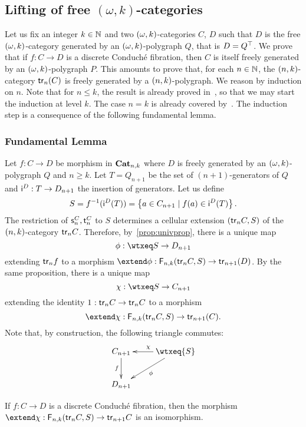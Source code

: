 \subsection{Lifting of free
  $(\omega,k)$-categories}\label{subsec:lifting}
\begin{paragr}
  Let us fix an integer $k\in\mathbb N$ and two $(\omega,k)$-categories
$C$, $D$ such that $D$ is the free $(\omega,k)$-category
generated by an $(\omega,k)$-polygraph $Q$, that is
$D=Q^\top$. We prove that if $f:C\to D$ is a discrete Conduché
fibration, then $C$ is itself freely generated by an
$(\omega,k)$-polygraph $P$. This amounts to prove that, for each
$n\in \mathbb N$, the $(n,k)$-category $\mathsf{tr}_{n}(C)$ is freely generated by
a $(n,k)$-polygraph. We reason by induction on $n$. Note that for
$n\leq k$, the result is already proved in~\cite{guetta:poldcf}, so that
we may start the induction at level $k$. The case $n=k$ is already
covered by~\cite{guetta:poldcf}. The induction step is a consequence
of the following fundamental lemma.
\end{paragr}
\subsubsection{Fundamental Lemma}\label{ssubsec:fundamental}
Let $f:C\to D$ be morphism in $\mathbf{Cat}_{n,k}$ where $D$ is freely
generated by an $(\omega,k)$-polygraph $Q$ and $n\geq k$. Let
$T=Q_{n+1}$ be the set of $(n{+}1)$-generators of $Q$ and
$\mathsf{i}^D:T\to D_{n+1}$ the insertion of generators.  Let us define
\[
  S=f^{-1}(\mathsf{i}^D(T))=\left\{ a\in C_{n+1}\; | \; f(a)\in \mathsf{i}^D(T)\right\}.
\]
The restriction of $\mathsf{s}_{n}^C,\mathsf{t}_{n}^C$ to $S$ determines a
cellular extension $(\mathsf{tr}_{n}C,S)$ of the $(n,k)$-category $\mathsf{tr}_{n}C$. Therefore, by~\cref{prop:univprop}, there is a unique map
\[\phi: \wtxeq S\to D_{n+1}\]
extending $\mathsf{tr}_{n} f$ to a morphism $\extend\phi:\frf{n,k}(\trk n C,S)\to
\trk{n+1}(D)$. By the same proposition, there is a unique map
\[\chi:\wtxeq S\to C_{n+1}\]
extending the identity $1^{}:\mathsf{tr}_{n}C\to\mathsf{tr}_{n} C$ to a morphism
\[\extend\chi:\frf{n,k}(\trk n C,S)\to
  \trk{n+1}(C).\]
Note that, by construction, the following triangle commutes:
\[
  \xymatrix{C_{n+1} \ar[d]_f& \wtxeq{S}\ar[l]_{\chi}\ar[dl]^{\phi}\\
  D_{n+1}&}
\]
\begin{lemma}\label{lemma:fundamental}
  If $f:C\to D$ is a discrete Conduché fibration, then the morphism $\extend\chi:\frf{n,k}(\trk n C,S)\to\trk{n+1}C$ is an isomorphism.
\end{lemma}